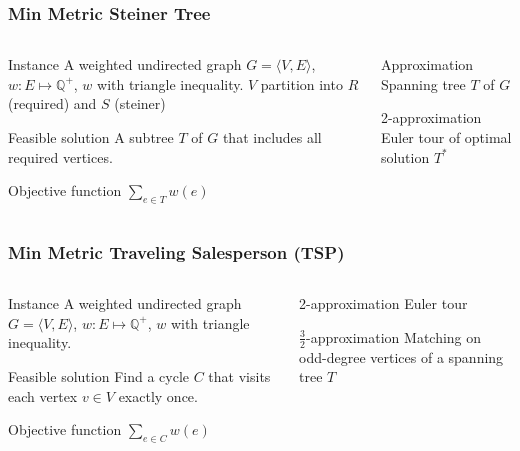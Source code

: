 \documentclass[12pt,aspectratio=169]{beamer}
\begin{document}
\begin{frame}\frametitle{Min Metric Steiner Tree}
\begin{columns} 
  \begin{column}{0.48\textwidth}
  \begin{block}{Instance}
    A weighted undirected graph $G=\langle V,E \rangle$, $w:E\mapsto \mathbb{Q}^{+}$, $w$
    with triangle inequality.
%
    $V$ partition into $R$ (required) and $S$ (steiner)
  \end{block}
  \begin{block}{Feasible solution}
    A subtree $T$ of $G$ that includes all required vertices.
%
  \end{block}
  \begin{block}{Objective function}
    $\sum_{e\in T}w(e)$
  \end{block}
\end{column}
    \begin{column}{0.48\textwidth}
      \begin{block}{Approximation}
        Spanning tree $T$ of $G$
      \end{block}
      \begin{block}{2-approximation}
Euler tour of optimal solution $T^{*}$
      \end{block}
    \end{column}
\end{columns}
\end{frame}

\begin{frame}\frametitle{Min Metric Traveling Salesperson (TSP)}
\begin{columns} 
  \begin{column}{0.48\textwidth}
  \begin{block}{Instance}
    A weighted undirected graph $G=\langle V,E \rangle$, $w:E\mapsto \mathbb{Q}^{+}$, $w$
    with triangle inequality.
  \end{block}
  \begin{block}{Feasible solution}
    Find a cycle $C$ that visits each vertex  $v\in V$ exactly once.
%
  \end{block}
  \begin{block}{Objective function}
    $\sum_{e\in C}w(e)$
  \end{block}
\end{column}
    \begin{column}{0.48\textwidth}
      \begin{block}{2-approximation}
        Euler tour
      \end{block}
      \begin{block}{$\frac{3}{2}$-approximation}
Matching on odd-degree vertices of a spanning tree $T$
      \end{block}
    \end{column}
\end{columns}
\end{frame}
\end{document}
